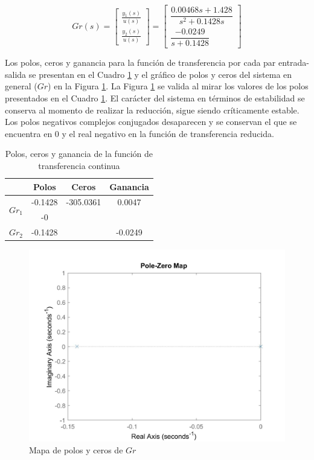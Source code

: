 \documentclass[journal]{IEEEtran}
\begin{document}
\begin{equation}
\label{tf:Gr}
Gr(s)=\begin{bmatrix}
  \frac{y_1(s)}{u(s)}\\
  \frac{y_2(s)}{u(s)}
\end{bmatrix} = 
\begin{bmatrix}
\dfrac{0.00468 s + 1.428}{s^2 + 0.1428 s}\\
\dfrac{-0.0249}{s + 0.1428}
\end{bmatrix}
\end{equation}

Los polos, ceros y ganancia para la función de transferencia por cada par entrada-salida se presentan en el Cuadro \ref{tab: pzg tfr} y el gráfico de polos y ceros del sistema en general ($Gr$) en la Figura \ref{fig:pzGr}. La Figura \ref{fig:pzGr} se valida al mirar los valores de los polos presentados en el Cuadro \ref{tab: pzg tfr}. El carácter del sistema en términos de estabilidad se conserva al momento de realizar la reducción, sigue siendo críticamente estable. Los polos negativos complejos conjugados desaparecen y se conservan el que se encuentra en 0 y el real negativo en la función de transferencia reducida.

\begin{table}[!h]
\centering
\caption{Polos, ceros y ganancia de la función de transferencia continua}
\label{tab: pzg tfr}
\begin{tabular}{@{}lccc@{}}
\toprule
                  & Polos & Ceros             & Ganancia          \\ \midrule
\multirow{2}{*}{$Gr_1$} & -0.1428 & -305.0361 & 0.0047 \\
                  & -0 & &                   \\
                 \midrule
$Gr_2$ & -0.1428 &  & -0.0249                 
                  \\ \bottomrule
\end{tabular}
\end{table}

\begin{figure}[ht!]
\caption{Mapa de polos y ceros de $Gr$\label{fig:pzGr}}
  \centering
\includegraphics[scale=0.18]{tf/pzmap_Gr.jpg}
\end{figure}
\end{document}
